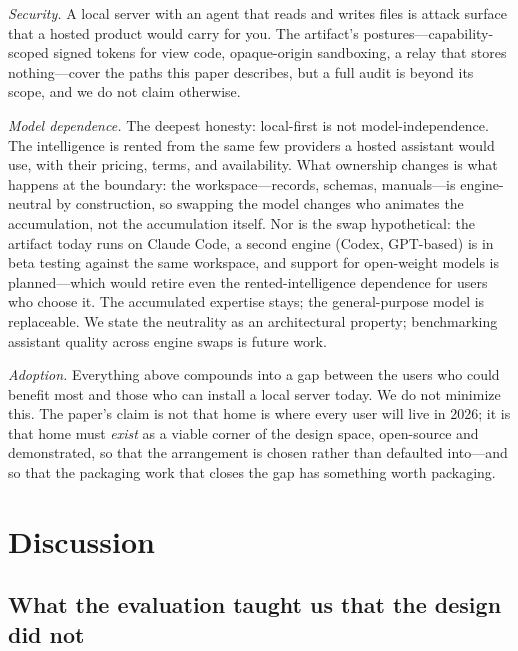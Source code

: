 \documentclass[11pt]{article}
\begin{document}
\emph{Security.} A local server with an agent that reads and writes files is
attack surface that a hosted product would carry for you. The artifact's
postures---capability-scoped signed tokens for view code, opaque-origin
sandboxing, a relay that stores nothing---cover the paths this paper describes,
but a full audit is beyond its scope, and we do not claim otherwise.

\emph{Model dependence.} The deepest honesty: local-first is not
model-independence. The intelligence is rented from the same few providers a
hosted assistant would use, with their pricing, terms, and availability. What
ownership changes is what happens at the boundary: the workspace---records,
schemas, manuals---is engine-neutral by construction, so swapping the model
changes who animates the accumulation, not the accumulation itself. Nor is the
swap hypothetical: the artifact today runs on Claude Code, a second engine
(Codex, GPT-based) is in beta testing against the same workspace, and support
for open-weight models is planned---which would retire even the
rented-intelligence dependence for users who choose it. The accumulated
expertise stays; the general-purpose model is replaceable. We state the neutrality as an
architectural property; benchmarking assistant quality across engine swaps is
future work.

\emph{Adoption.} Everything above compounds into a gap between the users who
could benefit most and those who can install a local server today. We do not
minimize this. The paper's claim is not that home is where every user will live
in 2026; it is that home must \emph{exist} as a viable corner of the design
space, open-source and demonstrated, so that the arrangement is chosen rather
than defaulted into---and so that the packaging work that closes the gap has
something worth packaging.

\section{Discussion}
\label{sec:discussion}

\subsection{What the evaluation taught us that the design did not}
\label{sec:surprises}
\end{document}
